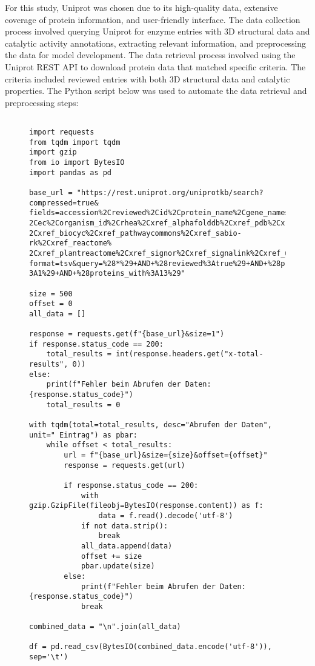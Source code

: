 For this study, Uniprot was chosen due to its high-quality data, extensive coverage of protein information, and user-friendly interface. The data collection process involved querying Uniprot for enzyme entries with 3D structural data and catalytic activity annotations, extracting relevant information, and preprocessing the data for model development. The data retrieval process involved using the Uniprot REST API to download protein data that matched specific criteria. The criteria included reviewed entries with both 3D structural data and catalytic properties. The Python script below was used to automate the data retrieval and preprocessing steps:  \autocite{polleyTobiasPolDeepZyme2024}

\begin{figure}[h!]
\begin{lstlisting}[caption=Python script for data retrieval and preprocessing from Uniprot, label=lst:uniprot_data_retrieval]

import requests
from tqdm import tqdm
import gzip
from io import BytesIO
import pandas as pd

base_url = "https://rest.uniprot.org/uniprotkb/search?compressed=true&
fields=accession%2Creviewed%2Cid%2Cprotein_name%2Cgene_names%2Corganism_name%
2Cec%2Corganism_id%2Crhea%2Cxref_alphafolddb%2Cxref_pdb%2Cxref_brenda%
2Cxref_biocyc%2Cxref_pathwaycommons%2Cxref_sabio-rk%2Cxref_reactome%
2Cxref_plantreactome%2Cxref_signor%2Cxref_signalink%2Cxref_unipathway&
format=tsv&query=%28*%29+AND+%28reviewed%3Atrue%29+AND+%28proteins_with%
3A1%29+AND+%28proteins_with%3A13%29"

size = 500
offset = 0
all_data = []

response = requests.get(f"{base_url}&size=1")
if response.status_code == 200:
    total_results = int(response.headers.get("x-total-results", 0))
else:
    print(f"Fehler beim Abrufen der Daten: {response.status_code}")
    total_results = 0

with tqdm(total=total_results, desc="Abrufen der Daten", unit=" Eintrag") as pbar:
    while offset < total_results:
        url = f"{base_url}&size={size}&offset={offset}"
        response = requests.get(url)
        
        if response.status_code == 200:
            with gzip.GzipFile(fileobj=BytesIO(response.content)) as f:
                data = f.read().decode('utf-8')
            if not data.strip():
                break
            all_data.append(data)
            offset += size
            pbar.update(size)
        else:
            print(f"Fehler beim Abrufen der Daten: {response.status_code}")
            break

combined_data = "\n".join(all_data)

df = pd.read_csv(BytesIO(combined_data.encode('utf-8')), sep='\t')

\end{lstlisting}
\end{figure}


